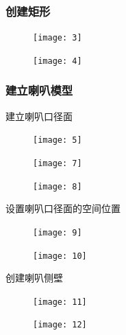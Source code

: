 \documentclass{../source/Experiment}
\begin{document}
            \subsubsection{创建矩形}

            \begin{figure}[H]
                \centering
                \texttt{[image: 3]}
                \caption{}
            \end{figure}
            
            \begin{figure}[H]
                \centering
                \texttt{[image: 4]}
                \caption{}
            \end{figure}
            
            \subsubsection{建立喇叭模型}

            建立喇叭口径面
            \begin{figure}[H]
                \centering
                \texttt{[image: 5]}
                \caption{}
            \end{figure}

            \begin{figure}[H]
                \centering
                \texttt{[image: 7]}
                \caption{}
            \end{figure}

            \begin{figure}[H]
                \centering
                \texttt{[image: 8]}
                \caption{}
            \end{figure}


            设置喇叭口径面的空间位置

            \begin{figure}[H]
                \centering
                \texttt{[image: 9]}
                \caption{}
            \end{figure}


            \begin{figure}[H]
                \centering
                \texttt{[image: 10]}
                \caption{}
            \end{figure}
            创建喇叭侧壁
            \begin{figure}[H]
                \centering
                \texttt{[image: 11]}
                \caption{}
            \end{figure}
            \begin{figure}[H]
                \centering
                \texttt{[image: 12]}
                \caption{}
            \end{figure}
\end{document}
